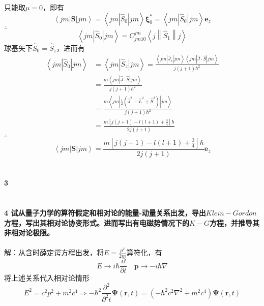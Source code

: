 \documentclass[12pt]{article}
\numberwithin{equation}{section}	 %
\begin{document}
\begin{spacing}{1.5}
\begin{equation}
\end{equation}
只能取$\mu=0$，即有
\begin{equation}
\left<jm\left|\bm{S}\right|jm\right> = \left<jm\left|\hat{S}_{0}\right|jm\right>\bm\xi^{*}_{0} = \left<jm\left|\hat{S}_{0}\right|jm\right>\bm{e}_{z}
\end{equation}
$\therefore$
\begin{equation}
\left<jm\left|\hat{S}_{0}\right|jm\right> = C^{jm}_{jm10}\left<j\left\|\hat{S}_{1}\right\|j\right>
\end{equation}
球基矢下$\hat{S}_{0}=\hat{S}_{z}$，进而有
\begin{align*}
\left<jm\left|\hat{S}_{0}\right|jm\right> &= \left<jm\left|\hat{S}_{z}\right|jm\right> = \frac{\left<jm\left|\hat{J}_{z}\right|jm\right>\left<jm\left|\hat{J}\cdot\hat{S}\right|jm\right>}{j(j+1)\hbar^{2}} \\
&= \frac{m\left<jm\left|\hat{J}\cdot\hat{S}\right|jm\right>}{j(j+1)\hbar^{2}} \\
&= \frac{m\left<jm\left| \displaystyle \frac{1}{2}\left(\hat{J}^{2}-\hat{L}^{2}+\hat{S}^{2}\right) \right|jm\right>}{j(j+1)\hbar^{2}} \\
&= \frac{m\left[j(j+1)-l(l+1)+\displaystyle \frac{3}{4}\right]\hbar}{2j(j+1)}
\end{align*}
$\therefore$
\begin{equation}
\left<jm\left|\bm{S}\right|jm\right> = \frac{m\left[j(j+1)-l(l+1)+\displaystyle \frac{3}{4}\right]\hbar}{2j(j+1)}\bm{e}_{z}
\end{equation}
~\\
~\\
\textbf{3 \quad }\\
~\\
~\\
\textbf{4 \quad 试从量子力学的算符假定和相对论的能量-动量关系出发，导出$Klein-Gordon$方程，写出其相对论协变形式。进而写出有电磁势情况下的$K-G$方程，并推导其非相对论极限。
}\\
~\\
解：从含时薛定谔方程出发，将$\displaystyle E=\frac{p^{2}}{2m}$算符化，有
\begin{equation}\nonumber 		%
E \rightarrow i\hbar\frac{\partial}{\partial t} \quad \bm{p} \rightarrow -i\hbar\nabla
\end{equation}
将上述关系代入相对论情形
\begin{equation}
E^{2}=c^{2}p^{2}+m^{2}c^{4} \Rightarrow -\hbar^{2}\frac{\partial^{2}}{\partial^{2} t}\bm\Psi\left(\bm{r},t\right) = \left(-\hbar^{2}c^{2}\nabla^{2}+m^{2}c^{4}\right)\bm\Psi\left(\bm{r},t\right)

\end{equation}
\end{spacing}
\end{document}
